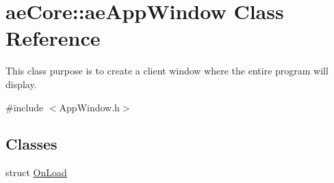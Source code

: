 \hypertarget{classae_core_1_1ae_app_window}{}\section{ae\+Core\+:\+:ae\+App\+Window Class Reference}
\label{classae_core_1_1ae_app_window}


This class purpose is to create a client window where the entire program will display.  




{\ttfamily \#include $<$App\+Window.\+h$>$}

\subsection*{Classes}
\begin{DoxyCompactItemize}
\item 
struct \hyperlink{structae_core_1_1ae_app_window_1_1_on_load}{On\+Load}
\end{DoxyCompactItemize}
